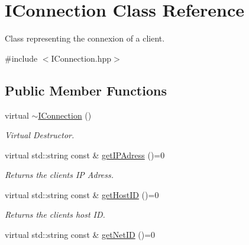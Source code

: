 \hypertarget{class_i_connection}{}\section{I\+Connection Class Reference}
\label{class_i_connection}


Class representing the connexion of a client.  




{\ttfamily \#include $<$I\+Connection.\+hpp$>$}

\subsection*{Public Member Functions}
\begin{DoxyCompactItemize}
\item 
\hypertarget{class_i_connection_a726589aeeff7948dea5a87c263e867dd}{}virtual \hyperlink{class_i_connection_a726589aeeff7948dea5a87c263e867dd}{$\sim$\+I\+Connection} ()\label{class_i_connection_a726589aeeff7948dea5a87c263e867dd}

\begin{DoxyCompactList}\small\item\em Virtual Destructor. \end{DoxyCompactList}\item 
\hypertarget{class_i_connection_a8812ae35dc3bada3bd961edb045c590b}{}virtual std\+::string const \& \hyperlink{class_i_connection_a8812ae35dc3bada3bd961edb045c590b}{get\+I\+P\+Adress} ()=0\label{class_i_connection_a8812ae35dc3bada3bd961edb045c590b}

\begin{DoxyCompactList}\small\item\em Returns the client\textquotesingle{}s I\+P Adress. \end{DoxyCompactList}\item 
\hypertarget{class_i_connection_ab87c32c04e1bbf322ab25bd7f752afcb}{}virtual std\+::string const \& \hyperlink{class_i_connection_ab87c32c04e1bbf322ab25bd7f752afcb}{get\+Host\+I\+D} ()=0\label{class_i_connection_ab87c32c04e1bbf322ab25bd7f752afcb}

\begin{DoxyCompactList}\small\item\em Returns the client\textquotesingle{}s host I\+D. \end{DoxyCompactList}\item 
\hypertarget{class_i_connection_a884aa2cf39ab4e58f5cdf79cb5eed99d}{}virtual std\+::string const \& \hyperlink{class_i_connection_a884aa2cf39ab4e58f5cdf79cb5eed99d}{get\+Net\+I\+D} ()=0\label{class_i_connection_a884aa2cf39ab4e58f5cdf79cb5eed99d}


\end{DoxyCompactItemize}
